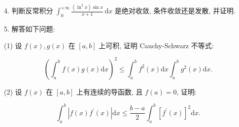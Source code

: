 \documentclass{examcollection}
\renewcommand{\displayformula}[1]{\[#1\]}
\begin{document}
{\begin{minipage}{\textwidth}
4. 判断反常积分 $\int_0^{+\infty} \frac{(\ln^2 x) \sin x}{x + 1} \, \mathrm{d}x$ 是绝对收敛, 条件收敛还是发散, 并证明.\par
5. 解答如下问题:\par
(1) 设 $f(x), g(x)$ 在 $[a, b]$ 上可积, 证明 Cauchy-Schwarz 不等式:\par
\displayformula{\left(\int_ {a} ^ {b} f (x) g (x) \mathrm{d} x\right) ^ {2} \leq \int_ {a} ^ {b} f ^ {2} (x) \mathrm{d} x \int_ {a} ^ {b} g ^ {2} (x) \mathrm{d} x.}\par
(2) 设 $f(x)$ 在 $[a, b]$ 上有连续的导函数, 且 $f(a) = 0$, 证明:\par
\displayformula{\int_ {a} ^ {b} | f (x) f ^ {\prime} (x) | \mathrm{d} x \leq \frac {b - a}{2} \int_ {a} ^ {b} [ f ^ {\prime} (x) ] ^ {2} \mathrm{d} x.}\par
\end{minipage}}
\ifdim\dimexpr\ht\proofbox+\dp\proofbox\relax>\textheight
\noindent\resizebox{!}{\textheight}{\usebox{\proofbox}}\else\noindent\usebox{\proofbox}\fi\clearpage
\end{document}
